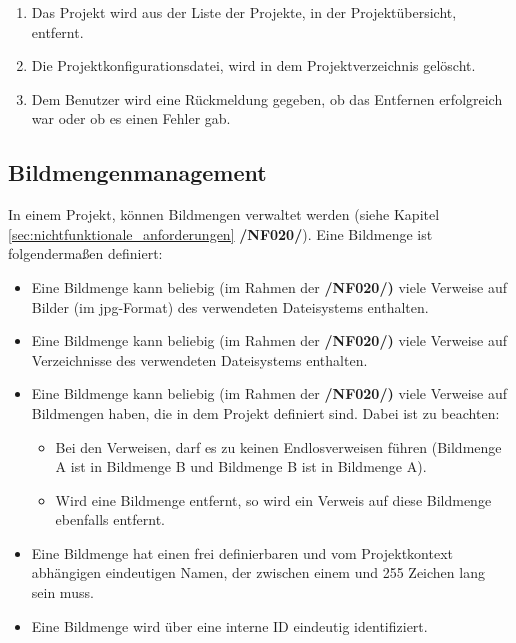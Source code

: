 \begin{description}
\begin{enumerate}
				\item Das Projekt wird aus der Liste der Projekte, in der Projektübersicht, entfernt.
				
				\item Die Projektkonfigurationsdatei, wird in dem Projektverzeichnis gelöscht.
				
				\item Dem Benutzer wird eine Rückmeldung gegeben, ob das Entfernen erfolgreich war oder ob es einen Fehler gab.
			
			\end{enumerate}
	
	\end{description}

\subsection{Bildmengenmanagement}

\label{subsec:bildmengenmgmt}
	
	In einem Projekt, können Bildmengen verwaltet werden (siehe Kapitel \ref{sec:nichtfunktionale_anforderungen} \textbf{/NF020/}). Eine Bildmenge ist folgendermaßen definiert:
	
	\begin{itemize}
		
		\item Eine Bildmenge kann beliebig (im Rahmen der \textbf{/NF020/)} viele Verweise auf Bilder (im \gls{jpg}-Format) des verwendeten Dateisystems enthalten.
		
		\item Eine Bildmenge kann beliebig (im Rahmen der \textbf{/NF020/)} viele Verweise auf Verzeichnisse des verwendeten Dateisystems enthalten.
		
		\item Eine Bildmenge kann beliebig (im Rahmen der \textbf{/NF020/)} viele Verweise auf Bildmengen haben, die in dem Projekt definiert sind. Dabei ist zu beachten:
		
			\begin{itemize}
			
				\item Bei den Verweisen, darf es zu keinen Endlosverweisen führen (Bildmenge A ist in Bildmenge B und Bildmenge B ist in Bildmenge A).
				
				\item Wird eine Bildmenge entfernt, so wird ein Verweis auf diese Bildmenge ebenfalls entfernt.
			
			\end{itemize}
		
		\item Eine Bildmenge hat einen frei definierbaren und vom Projektkontext abhängigen eindeutigen Namen, der zwischen einem und 255 Zeichen lang sein muss.
		
		\item Eine Bildmenge wird über eine interne ID eindeutig identifiziert.
	
	\end{itemize}
	
